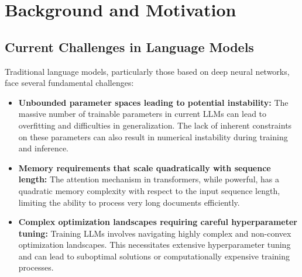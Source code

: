 \documentclass[twocolumn]{article}
\begin{document}
\section{Background and Motivation}

\subsection{Current Challenges in Language Models}
Traditional language models, particularly those based on deep neural networks, face several fundamental challenges:
\begin{itemize}
    \item \textbf{Unbounded parameter spaces leading to potential instability:} The massive number of trainable parameters in current LLMs can lead to overfitting and difficulties in generalization. The lack of inherent constraints on these parameters can also result in numerical instability during training and inference.
    \item \textbf{Memory requirements that scale quadratically with sequence length:} The attention mechanism in transformers, while powerful, has a quadratic memory complexity with respect to the input sequence length, limiting the ability to process very long documents efficiently.
    \item \textbf{Complex optimization landscapes requiring careful hyperparameter tuning:} Training LLMs involves navigating highly complex and non-convex optimization landscapes. This necessitates extensive hyperparameter tuning and can lead to suboptimal solutions or computationally expensive training processes.
\end{itemize}
\end{document}
